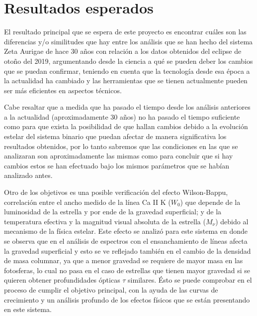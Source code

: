 \documentclass[11pt]{article}
\begin{document}

\section{Resultados esperados}

El resultado principal que se espera de este proyecto es encontrar cuáles son las diferencias y/o similitudes que hay entre los análisis que se han hecho del sistema Zeta Aurigae de hace 30 años con relación a los datos obtenidos del eclipse de otoño del 2019, argumentando desde la ciencia a qué se pueden deber los cambios que se puedan confirmar, teniendo en cuenta que la tecnología desde esa época a la actualidad ha cambiado y las herramientas que se tienen actualmente pueden ser más eficientes en aspectos técnicos.

Cabe resaltar que a medida que ha pasado el tiempo desde los análisis anteriores a la actualidad (aproximadamente 30 años) no ha pasado el  tiempo suficiente como para que exista la posibilidad de que hallan cambios debido a la evolución estelar del sistema binario que puedan afectar de manera significativa los resultados obtenidos, por lo tanto sabremos que las condiciones en las que se analizaran son aproximadamente las mismas como para concluir que si hay cambios estos se han efectuado bajo los mismos parámetros que se habían analizado antes.

Otro de los objetivos es una posible verificación del efecto Wilson-Bappu, correlación entre el ancho medido de la línea Ca II K ($W_0$) que depende de la luminosidad de la estrella y por ende de la gravedad superficial; y de la temperatura efectiva y la magnitud visual absoluta de la estrella ($M_{\nu}$) debido al mecanismo de la física estelar. Este efecto se analizó para este sistema en \cite{Dani} donde se observa que en el análisis de espectros con el ensanchamiento de líneas afecta la gravedad superficial y esto se ve reflejado también en el cambio de la densidad de masa columnar, ya que a menor gravedad se requiere de mayor masa en las fotosferas, lo cual  no pasa en el caso de estrellas que tienen mayor gravedad si se quieren obtener profundidades ópticas $\tau$ similares. Ésto se puede comprobar en el proceso de cumplir el objetivo principal, con la ayuda de las curvas de crecimiento y un análisis profundo de los efectos físicos que se están presentando en este sistema.
\end{document}
